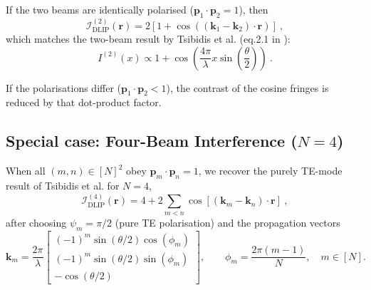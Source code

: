 If the two beams are identically polarised ($\mathbf{p}_1 \cdot \mathbf{p}_2 = 1$), then
\begin{equation}
   \mathcal{I}_\text{DLIP}^{(2)}(\mathbf{r}) = 2[1 + \cos((\mathbf{k}_1 - \mathbf{k}_2) \cdot \mathbf{r})] \ ,
\end{equation}
which matches the two-beam result by Tsibidis et al. (eq.2.1 in \cite{Fraggelakis_2021}):
\begin{equation}
   I^{(2)}(x) \propto 1 + \cos\left(\frac{4\pi}{\lambda} x \sin\left(\frac{\theta}{2} \right) \right) \ .
\end{equation}

If the polarisations differ ($\mathbf{p}_1 \cdot \mathbf{p}_2 < 1$), the contrast of the cosine fringes is reduced by that dot-product factor.

\subsection{Special case: Four-Beam Interference (\(N=4\))}

When all $(m,n) \in [N]^2$ obey $\mathbf{p}_m \cdot \mathbf{p}_n = 1$, we recover the purely TE-mode result of
Tsibidis et al. \cite{Fraggelakis_2021} for $N=4$,
\begin{equation}
   \mathcal{I}^{(4)}_\text{DLIP}(\mathbf{r}) = 4 + 2 \sum_{m<n} \cos[(\mathbf{k}_m - \mathbf{k}_n) \cdot \mathbf{r}] \ ,
\end{equation}
after choosing \(\psi_m=\pi/2\) (pure TE polarisation) and the propagation vectors
\[
   \mathbf{k}_m
   =
   \frac{2\pi}{\lambda}
   \begin{bmatrix}
      (-1)^m \sin(\theta/2)\cos(\phi_m) \\
      (-1)^m \sin(\theta/2)\sin(\phi_m) \\
      -\cos(\theta/2)
   \end{bmatrix},
   \qquad
   \phi_m=\frac{2\pi(m-1)}{N},
   \quad m\in[N].
\]
